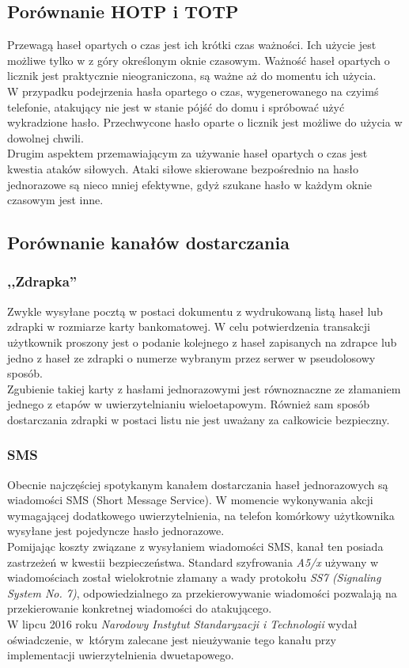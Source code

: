 \subsection{Porównanie HOTP i TOTP}
Przewagą haseł opartych o czas jest ich krótki czas ważności. 
Ich użycie jest możliwe tylko w z góry określonym oknie czasowym. 
Ważność haseł opartych o licznik jest praktycznie nieograniczona, są ważne aż do momentu ich użycia. \\
W przypadku podejrzenia hasła opartego o czas, wygenerowanego na czyimś telefonie, atakujący nie jest 
w stanie pójść do domu i spróbować użyć wykradzione hasło. 
Przechwycone hasło oparte o licznik jest możliwe do użycia w dowolnej chwili. \\
Drugim aspektem przemawiającym za używanie haseł opartych o czas jest kwestia ataków siłowych.
Ataki siłowe skierowane bezpośrednio na hasło jednorazowe są nieco mniej efektywne, gdyż 
szukane hasło w każdym oknie czasowym jest inne.

\subsection{Porównanie kanałów dostarczania}
\subsubsection{,,Zdrapka''}
Zwykle wysyłane pocztą w postaci dokumentu z wydrukowaną listą haseł lub zdrapki w rozmiarze 
karty bankomatowej. W celu potwierdzenia transakcji użytkownik proszony jest o podanie 
kolejnego z haseł zapisanych na zdrapce lub jedno z haseł ze zdrapki o numerze wybranym
przez serwer w pseudolosowy sposób. \\
Zgubienie takiej karty z hasłami jednorazowymi jest równoznaczne ze złamaniem jednego z etapów 
w uwierzytelnianiu wieloetapowym. Również sam sposób dostarczania zdrapki w postaci listu
nie jest uważany za całkowicie bezpieczny.

\subsubsection{SMS}
Obecnie najczęściej spotykanym kanałem dostarczania haseł jednorazowych są wiadomości SMS (Short Message Service). 
W momencie wykonywania akcji wymagającej dodatkowego uwierzytelnienia, na telefon komórkowy użytkownika 
wysyłane jest pojedyncze hasło jednorazowe. \\
Pomijając koszty związane z wysyłaniem wiadomości SMS, kanał ten posiada zastrzeżeń w kwestii bezpieczeństwa.
Standard szyfrowania \textit{A5/x} używany w wiadomościach został wielokrotnie złamany a wady protokołu 
\textit{SS7 (Signaling System No. 7)}, odpowiedzialnego za przekierowywanie wiadomości pozwalają na 
przekierowanie konkretnej wiadomości do atakującego. \\
W lipcu 2016 roku \textit{Narodowy Instytut Standaryzacji i Technologii} wydał oświadczenie, w~którym
zalecane jest nieużywanie tego kanału przy implementacji uwierzytelnienia dwuetapowego.


